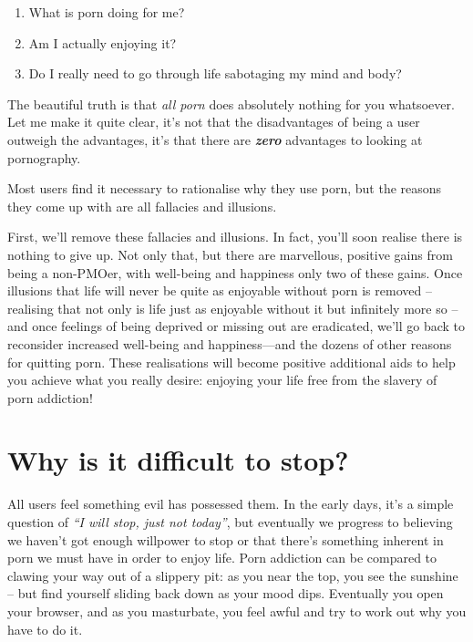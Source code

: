 \documentclass[
]{book}
\begin{document}
\begin{enumerate}
\def\labelenumi{\arabic{enumi}.}
\item
  What is porn doing for me?
\item
  Am I actually enjoying it?
\item
  Do I really need to go through life sabotaging my mind and body?
\end{enumerate}

The beautiful truth is that \emph{all porn} does absolutely nothing for you whatsoever. Let me make it quite clear, it's not that the disadvantages of being a user outweigh the advantages, it's that there are \textbf{\emph{zero}} advantages to looking at pornography.

Most users find it necessary to rationalise why they use porn, but the reasons they come up with are all fallacies and illusions.

First, we'll remove these fallacies and illusions. In fact, you'll soon realise there is nothing to give up. Not only that, but there are marvellous, positive gains from being a non-PMOer, with well-being and happiness only two of these gains. Once illusions that life will never be quite as enjoyable without porn is removed -- realising that not only is life just as enjoyable without it but infinitely more so -- and once feelings of being deprived or missing out are eradicated, we'll go back to reconsider increased well-being and happiness---and the dozens of other reasons for quitting porn. These realisations will become positive additional aids to help you achieve what you really desire: enjoying your life free from the slavery of porn addiction!

\hypertarget{why-is-it-difficult-to-stop}{%
\chapter{Why is it difficult to stop?}\label{why-is-it-difficult-to-stop}}

All users feel something evil has possessed them. In the early days, it's a simple question of \emph{``I will stop, just not today''}, but eventually we progress to believing we haven't got enough willpower to stop or that there's something inherent in porn we must have in order to enjoy life. Porn addiction can be compared to clawing your way out of a slippery pit: as you near the top, you see the sunshine -- but find yourself sliding back down as your mood dips. Eventually you open your browser, and as you masturbate, you feel awful and try to work out why you have to do it.
\end{document}
